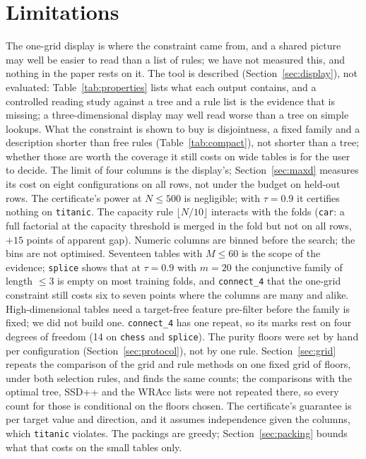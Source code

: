 \documentclass[11pt]{article}
\begin{document}
\section{Limitations}
The one-grid display is where the constraint came from, and a shared picture may well be easier to read than a list of rules; we have not measured this, and nothing in the paper rests on it. The tool is described (Section~\ref{sec:display}), not evaluated: Table~\ref{tab:properties} lists what each output contains, and a controlled reading study against a tree and a rule list is the evidence that is missing; a three-dimensional display may well read worse than a tree on simple lookups. What the constraint is shown to buy is disjointness, a fixed family and a description shorter than free rules (Table~\ref{tab:compact}), not shorter than a tree; whether those are worth the coverage it still costs on wide tables is for the user to decide. The limit of four columns is the display's; Section~\ref{sec:maxd} measures its cost on eight configurations on all rows, not under the budget on held-out rows. The certificate's power at $N\le 500$ is negligible; with $\tau=0.9$ it certifies nothing on \texttt{titanic}. The capacity rule $\lfloor N/10\rfloor$ interacts with the folds (\texttt{car}: a full factorial at the capacity threshold is merged in the fold but not on all rows, $+15$ points of apparent gap). Numeric columns are binned before the search; the bins are not optimised. Seventeen tables with $M\le 60$ is the scope of the evidence; \texttt{splice} shows that at $\tau=0.9$ with $m=20$ the conjunctive family of length $\le3$ is empty on most training folds, and \texttt{connect\_4} that the one-grid constraint still costs six to seven points where the columns are many and alike. High-dimensional tables need a target-free feature pre-filter before the family is fixed; we did not build one. \texttt{connect\_4} has one repeat, so its marks rest on four degrees of freedom (14 on \texttt{chess} and \texttt{splice}). The purity floors were set by hand per configuration (Section~\ref{sec:protocol}), not by one rule. Section~\ref{sec:grid} repeats the comparison of the grid and rule methods on one fixed grid of floors, under both selection rules, and finds the same counts; the comparisons with the optimal tree, SSD++ and the WRAcc lists were not repeated there, so every count for those is conditional on the floors chosen. The certificate's guarantee is per target value and direction, and it assumes independence given the columns, which \texttt{titanic} violates. The packings are greedy; Section~\ref{sec:packing} bounds what that costs on the small tables only.
\end{document}
